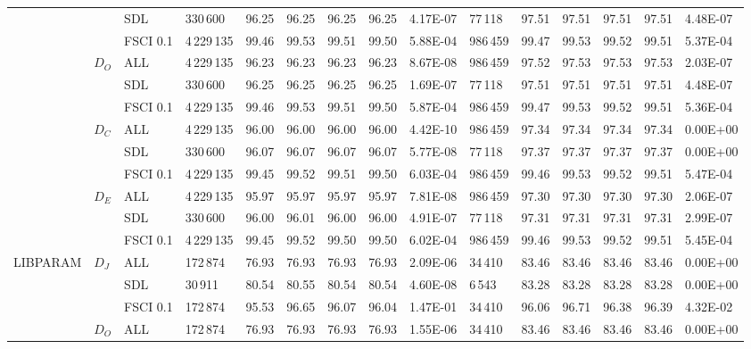 \begin{table*}[h]
\begin{tabular}{|lllllllllllllll|}
 & & SDL & 330\,600 & 96.25  & 96.25  & 96.25 & 96.25   & 4.17E-07   & 77\,118 & 97.51  & 97.51  & 97.51 & 97.51   & 4.48E-07    \\
 & & FSCI 0.1   & 4\,229\,135 & 99.46  & 99.53  & 99.51 & 99.50   & 5.88E-04 & 986\,459   & 99.47  & 99.53  & 99.52 & 99.51   & 5.37E-04    \\
 & \multirow{3}{*}{$D_O$}    & ALL & 4\,229\,135& 96.23  & 96.23  & 96.23 & 96.23   & 8.67E-08 & 986\,459   & 97.52  & 97.53  & 97.53 & 97.53   & 2.03E-07    \\
 & & SDL & 330\,600 & 96.25  & 96.25  & 96.25 & 96.25   & 1.69E-07  & 77\,118  & 97.51  & 97.51  & 97.51 & 97.51   & 4.48E-07    \\
 & & FSCI 0.1   & 4\,229\,135 & 99.46  & 99.53  & 99.51 & 99.50   & 5.87E-04  & 986\,459  & 99.47  & 99.53  & 99.52 & 99.51   & 5.36E-04    \\
 & \multirow{3}{*}{$D_C$}    & ALL& 4\,229\,135& 96.00  & 96.00  & 96.00 & 96.00   & 4.42E-10  & 986\,459  & 97.34  & 97.34  & 97.34 & 97.34   & 0.00E+00    \\
 & & SDL & 330\,600 & 96.07  & 96.07  & 96.07 & 96.07   & 5.77E-08  & 77\,118  & 97.37  & 97.37  & 97.37 & 97.37   & 0.00E+00    \\
 & & FSCI 0.1   & 4\,229\,135 & 99.45  & 99.52  & 99.51 & 99.50   & 6.03E-04  & 986\,459  & 99.46  & 99.53  & 99.52 & 99.51   & 5.47E-04    \\
 & \multirow{3}{*}{$D_E$} & ALL & 4\,229\,135& 95.97  & 95.97  & 95.97 & 95.97   & 7.81E-08 & 986\,459   & 97.30  & 97.30  & 97.30 & 97.30   & 2.06E-07    \\
 & & SDL & 330\,600 & 96.00  & 96.01  & 96.00 & 96.00   & 4.91E-07  & 77\,118  & 97.31  & 97.31  & 97.31 & 97.31   & 2.99E-07    \\
 & & FSCI 0.1  & 4\,229\,135  & 99.45  & 99.52  & 99.50 & 99.50   & 6.02E-04  & 986\,459  & 99.46  & 99.53  & 99.52 & 99.51   & 5.45E-04    \\
\hline
\multirow{12}{*}{LIBPARAM} & \multirow{3}{*}{$D_J$}   & ALL & 172\,874& 76.93  & 76.93  & 76.93 & 76.93   & 2.09E-06  & 34\,410  & 83.46  & 83.46  & 83.46 & 83.46   & 0.00E+00    \\
 & & SDL & 30\,911 & 80.54  & 80.55  & 80.54 & 80.54   & 4.60E-08 & 6\,543   & 83.28  & 83.28  & 83.28 & 83.28   & 0.00E+00    \\
 & & FSCI 0.1   & 172\,874 & 95.53  & 96.65  & 96.07 & 96.04   & 1.47E-01  & 34\,410  & 96.06  & 96.71  & 96.38 & 96.39   & 4.32E-02    \\
 & \multirow{3}{*}{$D_O$}    & ALL & 172\,874& 76.93  & 76.93  & 76.93 & 76.93   & 1.55E-06 & 34\,410   & 83.46  & 83.46  & 83.46 & 83.46   & 0.00E+00    \\

\end{tabular}
\end{table*}
